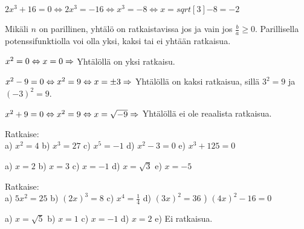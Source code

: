\begin{esimerkki}
$2x^3 + 16 = 0 \Leftrightarrow 2x^3 = -16 \Leftrightarrow x^3 = -8  \Leftrightarrow x = sqrt[3]{-8} = -2 $
\end{esimerkki}

Mikäli $n$ on parillinen, yhtälö on ratkaistavissa jos ja vain jos $\frac{b}{a} \geq 0 $. Parillisella potenssifunktiolla voi olla yksi, kaksi tai ei yhtään ratkaisua.

\begin{esimerkki}
$x^2 = 0 \Leftrightarrow x = 0 \\
\Rightarrow$ Yhtälöllä on yksi ratkaisu.
\end{esimerkki}

\begin{esimerkki}
$x^2 - 9 = 0 \Leftrightarrow x^2 = 9 \Leftrightarrow x = \pm 3 \\
\Rightarrow$ Yhtälöllä on kaksi ratkaisua, sillä $3^2 = 9$ ja $(-3)^2 = 9$.
\end{esimerkki}

\begin{esimerkki}
$x^2 + 9 = 0 \Leftrightarrow x^2 = 9 \Leftrightarrow x = \sqrt{-9} \\
\Rightarrow$ Yhtälöllä ei ole reaalista ratkaisua.
\end{esimerkki}

\begin{tehtava}
Ratkaise: \\
a) $ x^2 = 4 $ \qquad
b) $ x^3 = 27 $ \qquad
c) $ x^5 = -1 $ \qquad
d) $ x^2 - 3 = 0 $ \qquad
e) $ x^3 + 125 = 0 $
\begin{vastaus}
a) $ x = 2 $ \qquad
b) $ x = 3 $ \qquad
c) $ x = -1 $ \qquad
d) $ x = \sqrt{3} $ \qquad
e) $ x = -5 $ 
\end{vastaus}
\end{tehtava}

\begin{tehtava}
Ratkaise: \\
a) $ 5x^2 = 25 $ \qquad
b) $ (2x)^3 = 8 $ \qquad
c) $ x^4 = \frac{1}{4} $ \qquad
d) $ (3x)^2 = 36 $ ) $ (4x)^2 - 16 = 0 $ 
\begin{vastaus}
a) $ x = \sqrt{5} $ \qquad
b) $ x = 1 $ \qquad
c) $ x = -1 $ \qquad
d) $ x = 2 $ \qquad
e) Ei ratkaisua. 
\end{vastaus}
\end{tehtava}